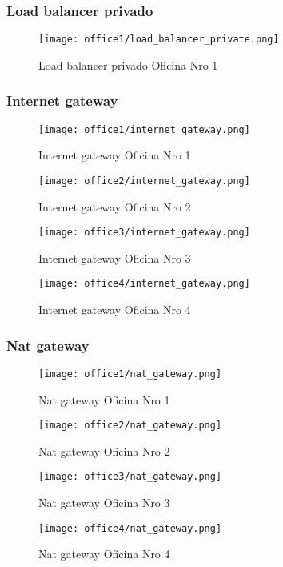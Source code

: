 \subsubsection{Load balancer privado}
\begin{figure}[H]
    \centering
    \texttt{[image: office1/load\_balancer\_private.png]}
    \caption{Load balancer privado Oficina Nro 1}
\end{figure}


\subsubsection{Internet gateway}
\begin{figure}[H]
    \centering
    \texttt{[image: office1/internet\_gateway.png]}
    \caption{Internet gateway Oficina Nro 1}
\end{figure}
\begin{figure}[H]
    \centering
    \texttt{[image: office2/internet\_gateway.png]}
    \caption{Internet gateway Oficina Nro 2}
\end{figure}
\begin{figure}[H]
    \centering
    \texttt{[image: office3/internet\_gateway.png]}
    \caption{Internet gateway Oficina Nro 3}
\end{figure}
\begin{figure}[H]
    \centering
    \texttt{[image: office4/internet\_gateway.png]}
    \caption{Internet gateway Oficina Nro 4}
\end{figure}

\subsubsection{Nat gateway}
\begin{figure}[H]
    \centering
    \texttt{[image: office1/nat\_gateway.png]}
    \caption{Nat gateway Oficina Nro 1}
\end{figure}
\begin{figure}[H]
    \centering
    \texttt{[image: office2/nat\_gateway.png]}
    \caption{Nat gateway Oficina Nro 2}
\end{figure}
\begin{figure}[H]
    \centering
    \texttt{[image: office3/nat\_gateway.png]}
    \caption{Nat gateway Oficina Nro 3}
\end{figure}
\begin{figure}[H]
    \centering
    \texttt{[image: office4/nat\_gateway.png]}
    \caption{Nat gateway Oficina Nro 4}
\end{figure}


